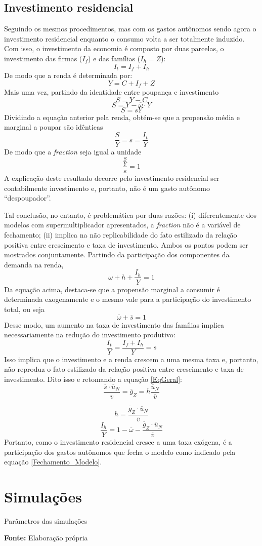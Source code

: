 \subsection{Investimento residencial}

Seguindo os mesmos procedimentos, mas com os gastos autônomos sendo agora o investimento residencial enquanto o consumo volta a ser totalmente induzido. Com isso, o investimento da economia é composto por duas parcelas, o investimento das firmas ($I_f$) e das famílias ($I_h = Z$):
$$
I_t = I_f + I_h
$$
De modo que a renda é determinada por:
$$
Y = C + I_f + Z
$$
Mais uma vez, partindo da identidade entre poupança e investimento
$$
S = Y - C
$$
$$
S = Y - \overline \omega\cdot Y
$$
$$
S = sY
$$
Dividindo a equação anterior pela renda, obtém-se que a propensão média e marginal a poupar são idênticas
$$
\frac{S}{Y} = s = \frac{I_t}{Y}
$$
De modo que a \textit{fraction} seja igual a unidade
$$
\frac{\frac{S}{Y}}{s} = 1
$$
A explicação deste resultado decorre pelo investimento residencial ser contabilmente investimento e, portanto, não é um gasto autônomo ``despoupador''. 

Tal conclusão, no entanto, é problemática por duas razões: (i) diferentemente dos modelos com supermultiplicador apresentados, a \textit{fraction} não é a variável de fechamento; (ii) implica na não replicabilidade do fato estilizado da relação positiva entre crescimento e taxa de investimento. Ambos os pontos podem ser mostrados conjuntamente. Partindo da participação dos componentes da demanda na renda,
$$
\omega + h + \frac{I_h}{Y} = 1
$$
Da equação acima, destaca-se que a propensão marginal a consumir é determinada exogenamente e o mesmo vale para a participação do investimento total, ou seja
$$
\overline \omega + \overline s = 1
$$
Desse modo, um aumento na taxa de investimento das famílias implica necessariamente na redução do investimento produtivo:
$$
\frac{I_t}{Y} = \frac{I_f + I_h}{Y} = s
$$
Isso implica que o investimento e a renda crescem a uma mesma taxa e, portanto, não reproduz o fato estilizado da relação positiva entre crescimento e taxa de investimento. Dito isso e retomando a equação \ref{EqGeral}:
$$
\frac{\overline s\cdot \overline u_N}{v} = \overline g_Z = h\frac{\overline u_N}{\overline v}
$$

\begin{equation}
h = \frac{\overline g_Z\cdot \overline u_N}{\overline v}
\end{equation}
\begin{equation}
    \label{Fechamento_Modelo}
\frac{I_h}{Y} = 1 - \overline\omega - \frac{\overline g_Z\cdot \overline u_N}{\overline v}
\end{equation}
Portanto, como o investimento residencial cresce a uma taxa exógena, é a participação dos gastos autônomos que fecha o modelo como indicado pela equação \ref{Fechamento_Modelo}. 

\section{Simulações}


\begin{table}[H]
	\centering
	\caption{Parâmetros das simulações}
	\label{Resumo_Simulacao}
	
	\caption*{\textbf{Fonte:} Elaboração própria}
\end{table}